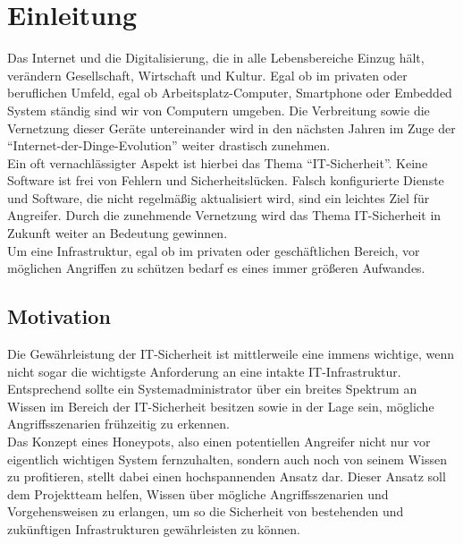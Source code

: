 \chapter{Einleitung}
\label{ch:einleitung}

Das Internet und die Digitalisierung, die in alle Lebensbereiche Einzug hält, verändern Gesellschaft, Wirtschaft und Kultur. Egal ob im privaten oder beruflichen Umfeld, egal ob Arbeitsplatz-Computer, Smartphone oder Embedded System ständig sind wir von Computern umgeben. Die Verbreitung sowie die Vernetzung dieser Geräte untereinander wird in den nächsten Jahren im Zuge der "`Internet-der-Dinge-Evolution"' weiter drastisch zunehmen.\\


Ein oft vernachlässigter Aspekt ist hierbei das Thema "`IT-Sicherheit"'. Keine Software ist frei von Fehlern und Sicherheitslücken. Falsch konfigurierte Dienste und Software, die nicht regelmäßig aktualisiert wird, sind ein leichtes Ziel für Angreifer. Durch die zunehmende Vernetzung wird das Thema IT-Sicherheit in Zukunft weiter an Bedeutung gewinnen.\\

Um eine Infrastruktur, egal ob im privaten oder geschäftlichen Bereich, vor möglichen Angriffen zu schützen bedarf es eines immer größeren Aufwandes.



\section{Motivation}
\label{sec:Motivation}

Die Gewährleistung der IT-Sicherheit ist mittlerweile eine immens wichtige, wenn nicht sogar die wichtigste Anforderung an eine intakte IT-Infrastruktur. Entsprechend sollte ein Systemadministrator über ein breites Spektrum an Wissen im Bereich der IT-Sicherheit besitzen sowie in der Lage sein, mögliche Angriffsszenarien frühzeitig zu erkennen.\\


Das Konzept eines Honeypots, also einen potentiellen Angreifer nicht nur vor eigentlich wichtigen System fernzuhalten, sondern auch noch von seinem Wissen zu profitieren, stellt dabei einen hochspannenden Ansatz dar. 
Dieser Ansatz soll dem Projektteam helfen, Wissen über mögliche Angriffsszenarien und Vorgehensweisen zu erlangen, um so die Sicherheit von bestehenden und zukünftigen Infrastrukturen gewährleisten zu können.

